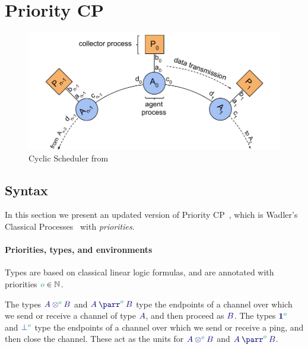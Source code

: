\documentclass[main.tex]{subfiles}
\begin{document}
\section{Priority CP}

\begin{figure}[t]
  \centering
  \includegraphics[width=0.8\columnwidth]{scheduler}
  \vspace{-4mm}
  \caption{Cyclic Scheduler from \cite{dardha2018}}
  \label{fig:scheduler}
  \vspace{-4mm}
  \end{figure}

\subsection{Syntax}

In this section we present an updated version of Priority CP~\cite{dardha2018}, which is Wadler's Classical Processes~\cite{wadler2012} with \emph{priorities}.


\paragraph*{Priorities, types, and environments}
Types are based on classical linear logic formulas, and are annotated with priorities $\cs{o}\in\mathbb{N}$.

The types $\ty{\tytens[\cs{o}]{A}{B}}$ and $\ty{\typarr[\cs{o}]{A}{B}}$ type the endpoints of a channel over which we send or receive a channel of type $\ty{A}$, and then proceed as $\ty{B}$.
The types $\ty{\tyone[\cs{o}]}$ and $\ty{\tybot[\cs{o}]}$ type the endpoints of a channel over which we send or receive a ping, and then close the channel. These act as the units for $\ty{\tytens[\cs{o}]{A}{B}}$ and $\ty{\typarr[\cs{o}]{A}{B}}$.
\end{document}
